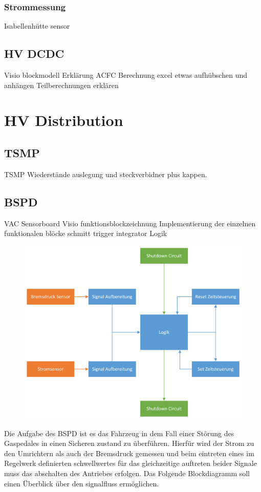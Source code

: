 \subsubsection{Strommessung}
Isabellenhütte sensor

\subsection{HV DCDC}
Visio blockmodell
Erklärung ACFC
Berechnung excel etwas aufhübschen und anhängen
Teilberechnungen erklären

\section{HV Distribution}

\subsection{TSMP}
TSMP Wiederstände auslegung und steckverbidner plus kappen.

\subsection{BSPD}

VAC Sensorboard
Visio funktionsblockzeichnung
Implementierung der einzelnen funktionalen blöcke
schmitt trigger
integrator
Logik
\begin{figure}
	\centering
	\includegraphics[width=0.7\linewidth]{"bilder/BSPD Blockdiagramm"}
	\caption{}
	\label{fig:bspd-blockdiagramm}
\end{figure}

Die Aufgabe des BSPD ist es das Fahrzeug in dem Fall einer Störung des Gaspedales in einen Sicheren zustand zu überführen. Hierfür wird der Strom zu den Umrichtern als auch der Bremsdruck gemessen und beim eintreten eines im Regelwerk definierten schwellwertes für das gleichzeitige auftreten beider Signale muss das abschalten des Antriebes erfolgen. Das Folgende Blockdiagramm soll einen Überblick über den signalfluss ermöglichen.

